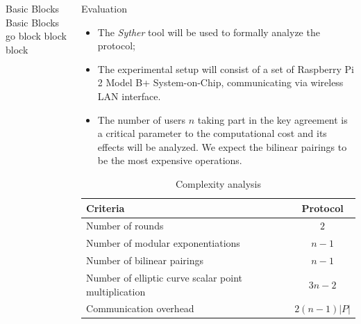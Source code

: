 \documentclass[final]{beamer}
\newlength{\onecolwid}
\newlength{\twocolwid}
\begin{document}
\begin{frame}[t]
\begin{columns}[t]
\begin{column}{\twocolwid}
\begin{columns}[t,totalwidth=\twocolwid]
\begin{column}{\onecolwid}
\begin{block}{Basic Blocks}
Basic Blocks go block block block
\end{block}

\end{column} %


\begin{column}{\onecolwid}\vspace{-.6in} %

\begin{block}{Evaluation}

\begin{itemize}
	\item The {\em Syther} tool will be used to formally analyze the protocol; \vspace*{0.3cm}
	\item The experimental setup will consist of a set of Raspberry Pi 2 Model B+ System-on-Chip, communicating via wireless LAN interface. \vspace*{0.3cm}
	\item The number of users $n$ taking part in the key agreement is a critical parameter to the computational cost and its effects will be analyzed. We expect the bilinear pairings to be the most expensive operations.
\end{itemize}

\vspace*{-1cm}
\begin{table}
\begin{tabular}{p{20cm} c}
\toprule
Criteria & Protocol \\
\midrule
Number of rounds & $2$ \\
Number of modular exponentiations & $n-1$ \\
Number of bilinear pairings & $n-1$ \\
Number of elliptic curve scalar point multiplication & $3n-2$ \\
Communication overhead & $2(n-1)|P|$ \\
\bottomrule
\end{tabular}
\vspace{0.1cm}
\caption{Complexity analysis}
\end{table}

\end{block}


\end{column}
\end{columns}
\end{column}
\end{columns}
\end{frame}
\end{document}
